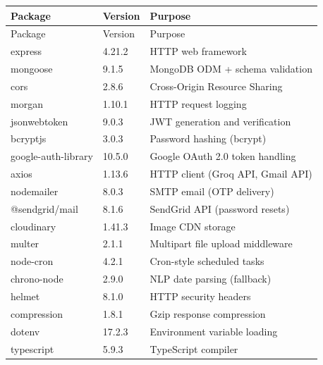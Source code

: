 \documentclass[12pt,a4paper]{report}
\begin{document}
\begin{longtable}{>{\ttfamily}l l p{7cm}}
\rowcolor{tableheadbg}
\color{white}\normalfont Package & \color{white}Version & \color{white}Purpose \\
\endfirsthead
\rowcolor{tableheadbg}
\color{white}\normalfont Package & \color{white}Version & \color{white}Purpose \\
\endhead
\toprule
\rowcolor{rowodd}  express              & 4.21.2   & HTTP web framework \\
\rowcolor{roweven} mongoose             & 9.1.5    & MongoDB ODM + schema validation \\
\rowcolor{rowodd}  cors                 & 2.8.6    & Cross-Origin Resource Sharing \\
\rowcolor{roweven} morgan               & 1.10.1   & HTTP request logging \\
\rowcolor{rowodd}  jsonwebtoken         & 9.0.3    & JWT generation and verification \\
\rowcolor{roweven} bcryptjs             & 3.0.3    & Password hashing (bcrypt) \\
\rowcolor{rowodd}  google-auth-library  & 10.5.0   & Google OAuth 2.0 token handling \\
\rowcolor{roweven} axios                & 1.13.6   & HTTP client (Groq API, Gmail API) \\
\rowcolor{rowodd}  nodemailer           & 8.0.3    & SMTP email (OTP delivery) \\
\rowcolor{roweven} @sendgrid/mail       & 8.1.6    & SendGrid API (password resets) \\
\rowcolor{rowodd}  cloudinary           & 1.41.3   & Image CDN storage \\
\rowcolor{roweven} multer               & 2.1.1    & Multipart file upload middleware \\
\rowcolor{rowodd}  node-cron            & 4.2.1    & Cron-style scheduled tasks \\
\rowcolor{roweven} chrono-node          & 2.9.0    & NLP date parsing (fallback) \\
\rowcolor{rowodd}  helmet               & 8.1.0    & HTTP security headers \\
\rowcolor{roweven} compression          & 1.8.1    & Gzip response compression \\
\rowcolor{rowodd}  dotenv               & 17.2.3   & Environment variable loading \\
\rowcolor{roweven} typescript           & 5.9.3    & TypeScript compiler \\
\bottomrule
\end{longtable}
\end{document}
